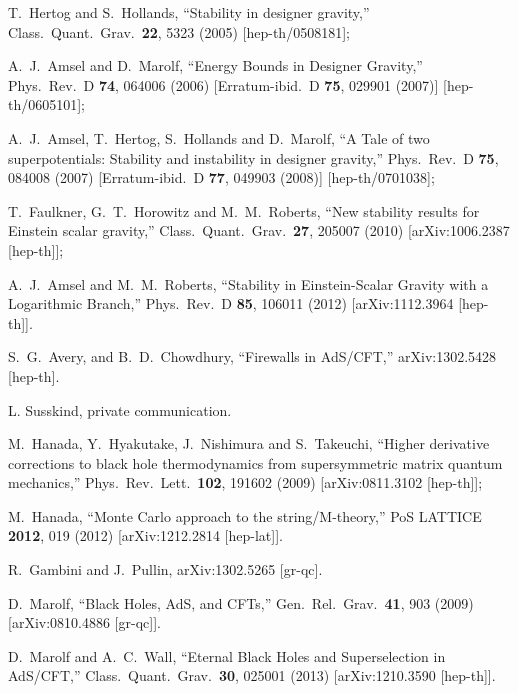 \documentclass[12pt]{article}
\begin{document}
{\begin{thebibliography}{99}
 T.~Hertog and S.~Hollands,
  ``Stability in designer gravity,''
  Class.\ Quant.\ Grav.\  {\bf 22}, 5323 (2005)
  [hep-th/0508181];

   A.~J.~Amsel and D.~Marolf,
  ``Energy Bounds in Designer Gravity,''
  Phys.\ Rev.\ D {\bf 74}, 064006 (2006)
  [Erratum-ibid.\ D {\bf 75}, 029901 (2007)]
  [hep-th/0605101];

    A.~J.~Amsel, T.~Hertog, S.~Hollands and D.~Marolf,
  ``A Tale of two superpotentials: Stability and instability in designer gravity,''
  Phys.\ Rev.\ D {\bf 75}, 084008 (2007)
  [Erratum-ibid.\ D {\bf 77}, 049903 (2008)]
  [hep-th/0701038];

   T.~Faulkner, G.~T.~Horowitz and M.~M.~Roberts,
  ``New stability results for Einstein scalar gravity,''
  Class.\ Quant.\ Grav.\  {\bf 27}, 205007 (2010)
  [arXiv:1006.2387 [hep-th]];

    A.~J.~Amsel and M.~M.~Roberts,
  ``Stability in Einstein-Scalar Gravity with a Logarithmic Branch,''
  Phys.\ Rev.\ D {\bf 85}, 106011 (2012)
  [arXiv:1112.3964 [hep-th]].


  S.~G.~Avery, and B.~D.~Chowdhury,
  ``Firewalls in AdS/CFT,''
  arXiv:1302.5428 [hep-th].


L. Susskind, private communication.

  M.~Hanada, Y.~Hyakutake, J.~Nishimura and S.~Takeuchi,
  ``Higher derivative corrections to black hole thermodynamics from supersymmetric matrix quantum mechanics,''
  Phys.\ Rev.\ Lett.\  {\bf 102}, 191602 (2009)
  [arXiv:0811.3102 [hep-th]];

  M.~Hanada,
  ``Monte Carlo approach to the string/M-theory,''
  PoS LATTICE {\bf 2012}, 019 (2012)
  [arXiv:1212.2814 [hep-lat]].

  R.~Gambini and J.~Pullin,
  arXiv:1302.5265 [gr-qc].


  D.~Marolf,
  ``Black Holes, AdS, and CFTs,''
  Gen.\ Rel.\ Grav.\  {\bf 41}, 903 (2009)
  [arXiv:0810.4886 [gr-qc]].

  D.~Marolf and A.~C.~Wall,
  ``Eternal Black Holes and Superselection in AdS/CFT,''
  Class.\ Quant.\ Grav.\  {\bf 30}, 025001 (2013)
  [arXiv:1210.3590 [hep-th]].


\end{thebibliography}}
\end{document}
